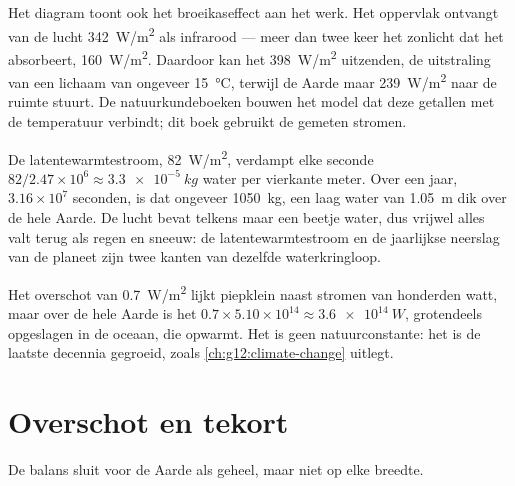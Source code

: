 Het diagram toont ook het broeikaseffect aan het werk. Het oppervlak ontvangt
van de lucht \qty{342}{W/m^2} als infrarood --- meer dan twee keer het zonlicht
dat het absorbeert, \qty{160}{W/m^2}. Daardoor kan het \qty{398}{W/m^2}
uitzenden, de uitstraling van een lichaam van ongeveer \qty{15}{\degreeCelsius},
terwijl de Aarde maar \qty{239}{W/m^2} naar de ruimte stuurt. De
natuurkundeboeken bouwen het model dat deze getallen met de temperatuur
verbindt; dit boek gebruikt de gemeten stromen.

\begin{example}\label{ex:g10:earth-energy-budget:evaporation}
De latentewarmtestroom, \qty{82}{W/m^2}, verdampt elke seconde $82/2.47\times
10^6 \approx \qty{3.3e-5}{kg}$ water per vierkante meter. Over een jaar,
$3.16\times10^7$ seconden, is dat ongeveer \qty{1050}{kg}, een laag water van
\qty{1.05}{m} dik over de hele Aarde. De lucht bevat telkens maar een beetje
water, dus vrijwel alles valt terug als regen en sneeuw: de latentewarmtestroom
en de jaarlijkse neerslag van de planeet zijn twee kanten van dezelfde
waterkringloop.
\end{example}

\begin{remark}[De onbalans]\label{rem:g10:earth-energy-budget:imbalance}
Het overschot van \qty{0.7}{W/m^2} lijkt piepklein naast stromen van honderden
watt, maar over de hele Aarde is het $0.7 \times 5.10\times10^{14} \approx
\qty{3.6e14}{W}$, grotendeels opgeslagen in de oceaan, die opwarmt. Het is geen
natuurconstante: het is de laatste decennia gegroeid, zoals
\cref{ch:g12:climate-change} uitlegt.
\end{remark}

\section{Overschot en tekort}

De balans sluit voor de Aarde als geheel, maar niet op elke breedte.

